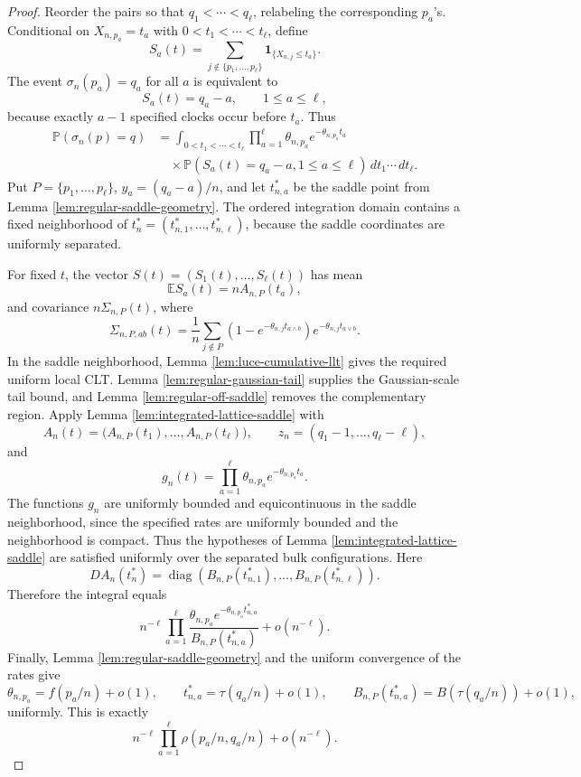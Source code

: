 \documentclass[11pt]{article}
\theoremstyle{remark}
\newcommand{\Pp}{\mathbb P}
\newcommand{\Ee}{\mathbb E}
\newcommand{\one}{\mathbf 1}
\newcommand{\diag}{\operatorname{diag}}
\newcommand{\dd}{\,d}
\begin{document}
\begin{proof}
Reorder the pairs so that \(q_1<\cdots<q_\ell\), relabeling the corresponding \(p_a\)'s.  Conditional on \(X_{n,p_a}=t_a\) with \(0<t_1<\cdots<t_\ell\), define
\[
        S_a(t)=\sum_{j\notin\{p_1,\ldots,p_\ell\}}\one_{\{X_{n,j}\le t_a\}}.
\]
The event \(\sigma_n(p_a)=q_a\) for all \(a\) is equivalent to
\[
        S_a(t)=q_a-a,
        \qquad 1\le a\le\ell,
\]
because exactly \(a-1\) specified clocks occur before \(t_a\).  Thus
\[
\begin{aligned}
\Pp(\sigma_n(p)=q)
  &=\int_{0<t_1<\cdots<t_\ell}
     \prod_{a=1}^\ell\theta_{n,p_a}e^{-\theta_{n,p_a}t_a}  \\
  &\quad\times
     \Pp(S_a(t)=q_a-a,1\le a\le\ell)\dd t_1\cdots\dd t_\ell .
\end{aligned}
\]
Put \(P=\{p_1,\ldots,p_\ell\}\), \(y_a=(q_a-a)/n\), and let \(t_{n,a}^*\) be the saddle point from Lemma \ref{lem:regular-saddle-geometry}.  The ordered integration domain contains a fixed neighborhood of \(t_n^*=(t_{n,1}^*,\ldots,t_{n,\ell}^*)\), because the saddle coordinates are uniformly separated.

For fixed \(t\), the vector \(S(t)=(S_1(t),\ldots,S_\ell(t))\) has mean
\[
        \Ee S_a(t)=nA_{n,P}(t_a),
\]
and covariance \(n\Sigma_{n,P}(t)\), where
\[
        \Sigma_{n,P,ab}(t)=\frac1n\sum_{j\notin P}
        (1-e^{-\theta_{n,j}t_{a\wedge b}})e^{-\theta_{n,j}t_{a\vee b}}.
\]
In the saddle neighborhood, Lemma \ref{lem:luce-cumulative-llt} gives the required uniform local CLT.  Lemma \ref{lem:regular-gaussian-tail} supplies the Gaussian-scale tail bound, and Lemma \ref{lem:regular-off-saddle} removes the complementary region.  Apply Lemma \ref{lem:integrated-lattice-saddle} with
\[
        A_n(t)=\bigl(A_{n,P}(t_1),\ldots,A_{n,P}(t_\ell)\bigr),
        \qquad
        z_n=(q_1-1,\ldots,q_\ell-\ell),
\]
and
\[
        g_n(t)=\prod_{a=1}^\ell\theta_{n,p_a}e^{-\theta_{n,p_a}t_a}.
\]
The functions \(g_n\) are uniformly bounded and equicontinuous in the saddle neighborhood, since the specified rates are uniformly bounded and the neighborhood is compact.  Thus the hypotheses of Lemma \ref{lem:integrated-lattice-saddle} are satisfied uniformly over the separated bulk configurations.  Here
\[
        DA_n(t_n^*)=
        \diag(B_{n,P}(t_{n,1}^*),\ldots,B_{n,P}(t_{n,\ell}^*)).
\]
Therefore the integral equals
\[
        n^{-\ell}\prod_{a=1}^\ell
        \frac{\theta_{n,p_a}e^{-\theta_{n,p_a}t_{n,a}^*}}{B_{n,P}(t_{n,a}^*)}
        +o(n^{-\ell}).
\]
Finally, Lemma \ref{lem:regular-saddle-geometry} and the uniform convergence of the rates give
\[
        \theta_{n,p_a}=f(p_a/n)+o(1),
        \qquad
        t_{n,a}^*=\tau(q_a/n)+o(1),
        \qquad
        B_{n,P}(t_{n,a}^*)=B(\tau(q_a/n))+o(1),
\]
uniformly.  This is exactly
\[
        n^{-\ell}\prod_{a=1}^\ell
        \rho(p_a/n,q_a/n)+o(n^{-\ell}).
\]
\end{proof}
\end{document}
